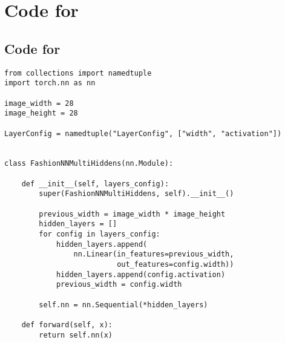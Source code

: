 
\section{Code for }
\label{section:appendix:code}
\subsection{Code for }
\begin{verbatim}
from collections import namedtuple
import torch.nn as nn

image_width = 28
image_height = 28

LayerConfig = namedtuple("LayerConfig", ["width", "activation"])


class FashionNNMultiHiddens(nn.Module):

    def __init__(self, layers_config):
        super(FashionNNMultiHiddens, self).__init__()

        previous_width = image_width * image_height
        hidden_layers = []
        for config in layers_config:
            hidden_layers.append(
                nn.Linear(in_features=previous_width,
                          out_features=config.width))
            hidden_layers.append(config.activation)
            previous_width = config.width

        self.nn = nn.Sequential(*hidden_layers)

    def forward(self, x):
        return self.nn(x)
\end{verbatim}

